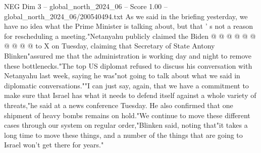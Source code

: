\begin{textsample}{NEG Dim 3 – global\_north\_2024\_06 – Score 1.00 – global\_north\_2024\_06/200540494.txt}
As we said in the briefing yesterday, we have no idea what the Prime Minister is talking about, but that ' s not a reason for rescheduling a meeting."Netanyahu publicly claimed the Biden @ @ @ @ @ @ @ @ @ @ to X on Tuesday, claiming that Secretary of State Antony Blinken"assured me that the administration is working day and night to remove these bottlenecks."The top US diplomat refused to discuss his conversation with Netanyahu last week, saying he was"not going to talk about what we said in diplomatic conversations.""I can just say, again, that we have a commitment to make sure that Israel has what it needs to defend itself against a whole variety of threats,"he said at a news conference Tuesday.
He also confirmed that one shipment of heavy bombs remains on hold."We continue to move these different cases through our system on regular order,"Blinken said, noting that"it takes a long time to move these things, and a number of the things that are going to Israel won't get there for years."

\end{textsample}

